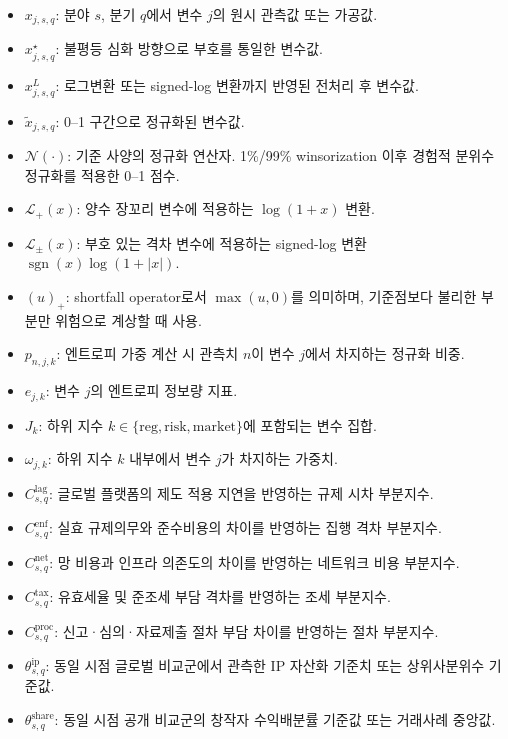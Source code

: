 \documentclass[11pt,a4paper]{report}
\newenvironment{summarylist}{\begin{itemize}[leftmargin=1.8em,itemsep=0.35em,topsep=0.35em]\RaggedRight}{\end{itemize}}
\begin{document}
\begin{summarylist}
  \item \textbf{$x_{j,s,q}$}: 분야 $s$, 분기 $q$에서 변수 $j$의 원시 관측값 또는 가공값.
  \item \textbf{$x^{\star}_{j,s,q}$}: 불평등 심화 방향으로 부호를 통일한 변수값.
  \item \textbf{$x^{L}_{j,s,q}$}: 로그변환 또는 signed-log 변환까지 반영된 전처리 후 변수값.
  \item \textbf{$\widetilde{x}_{j,s,q}$}: 0--1 구간으로 정규화된 변수값.
  \item \textbf{$\mathcal{N}(\cdot)$}: 기준 사양의 정규화 연산자. 1\%/99\% winsorization 이후 경험적 분위수 정규화를 적용한 0--1 점수.
  \item \textbf{$\mathcal{L}_{+}(x)$}: 양수 장꼬리 변수에 적용하는 $\log(1+x)$ 변환.
  \item \textbf{$\mathcal{L}_{\pm}(x)$}: 부호 있는 격차 변수에 적용하는 signed-log 변환 $\operatorname{sgn}(x)\log(1+|x|)$.
  \item \textbf{$(u)_+$}: shortfall operator로서 $\max(u,0)$를 의미하며, 기준점보다 불리한 부분만 위험으로 계상할 때 사용.
  \item \textbf{$p_{n,j,k}$}: 엔트로피 가중 계산 시 관측치 $n$이 변수 $j$에서 차지하는 정규화 비중.
  \item \textbf{$e_{j,k}$}: 변수 $j$의 엔트로피 정보량 지표.
  \item \textbf{$J_k$}: 하위 지수 $k \in \{\mathrm{reg},\mathrm{risk},\mathrm{market}\}$에 포함되는 변수 집합.
  \item \textbf{$\omega_{j,k}$}: 하위 지수 $k$ 내부에서 변수 $j$가 차지하는 가중치.
  \item \textbf{$C^{\mathrm{lag}}_{s,q}$}: 글로벌 플랫폼의 제도 적용 지연을 반영하는 규제 시차 부분지수.
  \item \textbf{$C^{\mathrm{enf}}_{s,q}$}: 실효 규제의무와 준수비용의 차이를 반영하는 집행 격차 부분지수.
  \item \textbf{$C^{\mathrm{net}}_{s,q}$}: 망 비용과 인프라 의존도의 차이를 반영하는 네트워크 비용 부분지수.
  \item \textbf{$C^{\mathrm{tax}}_{s,q}$}: 유효세율 및 준조세 부담 격차를 반영하는 조세 부분지수.
  \item \textbf{$C^{\mathrm{proc}}_{s,q}$}: 신고·심의·자료제출 절차 부담 차이를 반영하는 절차 부분지수.
  \item \textbf{$\theta^{\mathrm{ip}}_{s,q}$}: 동일 시점 글로벌 비교군에서 관측한 IP 자산화 기준치 또는 상위사분위수 기준값.
  \item \textbf{$\theta^{\mathrm{share}}_{s,q}$}: 동일 시점 공개 비교군의 창작자 수익배분률 기준값 또는 거래사례 중앙값.

\end{summarylist}
\end{document}
